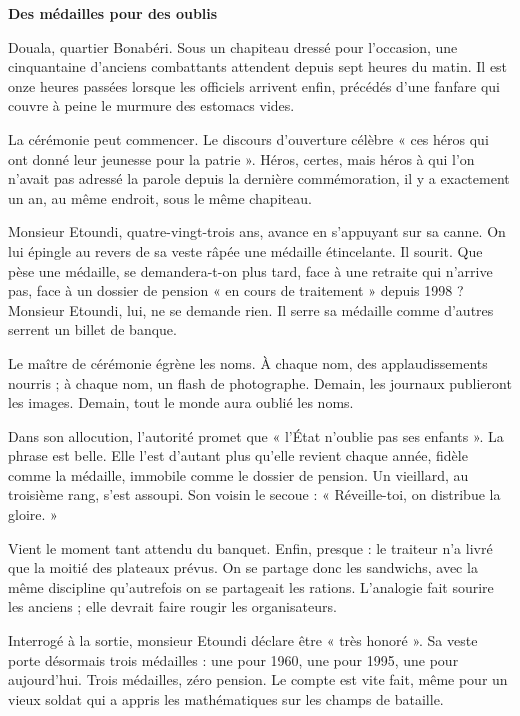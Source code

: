 \documentclass[11pt]{article}
\begin{document}
\begin{exemplebox}
\textbf{Des médailles pour des oublis}

Douala, quartier Bonabéri. Sous un chapiteau dressé pour l'occasion, une cinquantaine d'anciens combattants attendent depuis sept heures du matin. Il est onze heures passées lorsque les officiels arrivent enfin, précédés d'une fanfare qui couvre à peine le murmure des estomacs vides.

La cérémonie peut commencer. Le discours d'ouverture célèbre « ces héros qui ont donné leur jeunesse pour la patrie ». Héros, certes, mais héros à qui l'on n'avait pas adressé la parole depuis la dernière commémoration, il y a exactement un an, au même endroit, sous le même chapiteau.

Monsieur Etoundi, quatre-vingt-trois ans, avance en s'appuyant sur sa canne. On lui épingle au revers de sa veste râpée une médaille étincelante. Il sourit. Que pèse une médaille, se demandera-t-on plus tard, face à une retraite qui n'arrive pas, face à un dossier de pension « en cours de traitement » depuis 1998 ? Monsieur Etoundi, lui, ne se demande rien. Il serre sa médaille comme d'autres serrent un billet de banque.

Le maître de cérémonie égrène les noms. À chaque nom, des applaudissements nourris ; à chaque nom, un flash de photographe. Demain, les journaux publieront les images. Demain, tout le monde aura oublié les noms.

Dans son allocution, l'autorité promet que « l'État n'oublie pas ses enfants ». La phrase est belle. Elle l'est d'autant plus qu'elle revient chaque année, fidèle comme la médaille, immobile comme le dossier de pension. Un vieillard, au troisième rang, s'est assoupi. Son voisin le secoue : « Réveille-toi, on distribue la gloire. »

Vient le moment tant attendu du banquet. Enfin, presque : le traiteur n'a livré que la moitié des plateaux prévus. On se partage donc les sandwichs, avec la même discipline qu'autrefois on se partageait les rations. L'analogie fait sourire les anciens ; elle devrait faire rougir les organisateurs.

Interrogé à la sortie, monsieur Etoundi déclare être « très honoré ». Sa veste porte désormais trois médailles : une pour 1960, une pour 1995, une pour aujourd'hui. Trois médailles, zéro pension. Le compte est vite fait, même pour un vieux soldat qui a appris les mathématiques sur les champs de bataille.


\end{exemplebox}
\end{document}
